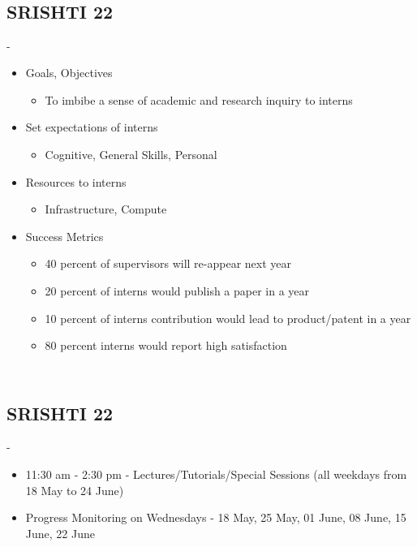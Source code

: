 \subsection{\\SRISHTI 22}

\begin{frame}[fragile=singleslide]{\insertsectionhead - \insertsubsectionhead}
\begin{center}
\begin{itemize}
\item Goals, Objectives
\begin{itemize}
\item To imbibe a sense of academic and research inquiry to interns
\end{itemize}
\item Set expectations of interns
\begin{itemize}
\item Cognitive, General Skills, Personal 
\end{itemize}
\item Resources to interns
\begin{itemize}
\item Infrastructure, Compute
\end{itemize}
\item Success Metrics
\begin{itemize}
\item 40 percent of supervisors will re-appear next year
\item 20 percent of interns would publish a paper in a year
\item 10 percent of interns contribution would lead to product/patent in a year
\item 80 percent interns would report high satisfaction
\end{itemize}
\end{itemize}
\end{center}
\end{frame}

\subsection{\\SRISHTI 22}

\begin{frame}[fragile=singleslide]{\insertsectionhead - \insertsubsectionhead}
\begin{center}
\begin{itemize}
\item 11:30 am - 2:30 pm - Lectures/Tutorials/Special Sessions (all weekdays from 18 May to 24 June)
\item Progress Monitoring on Wednesdays - 18 May, 25  May, 01 June, 08 June, 15 June, 22 June	 
\end{itemize}
\end{center}
\end{frame}

